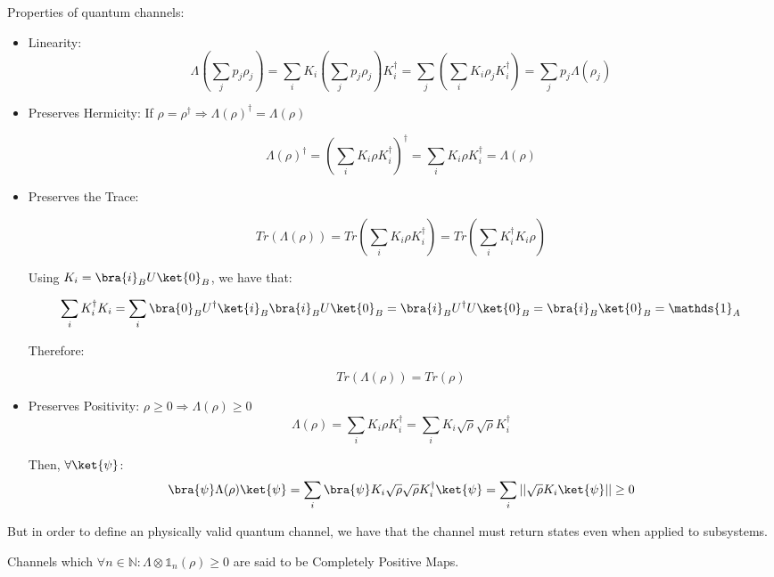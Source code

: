 Properties of quantum channels:
\begin{itemize}
    \item Linearity: 
    \begin{equation}
        \Lambda(\sum_j p_j \rho_j) = \sum_i K_i (\sum_j p_j \rho_j) K_i^\dagger = \sum_j \left( \sum_i K_i \rho_j K_i^\dagger \right) = \sum_j p_j \Lambda(\rho_j)
    \end{equation}
    
    
    \item Preserves Hermicity: If $\rho = \rho^\dagger \Rightarrow \Lambda(\rho)^\dagger = \Lambda(\rho)$
    
    \begin{equation}
        \Lambda(\rho)^\dagger = \left( \sum_i K_i \rho K_i^\dagger\right) ^\dagger =  \sum_i K_i \rho K_i^\dagger = \Lambda(\rho)
    \end{equation}
    \item Preserves the Trace:
    
    \begin{equation}
        Tr(\Lambda(\rho)) = Tr(\sum_i K_i \rho K_i^\dagger) = Tr(\sum_i K_i^\dagger K_i \rho)
    \end{equation}
    
    Using $K_i = \bra{i}_B U \ket{0}_B$, we have that:
    
    \begin{equation}
        \sum_i K_i^\dagger K_i = \sum_i \bra{0}_B U^\dagger \ket{i}_B  \bra{i}_B U \ket{0}_B =  \bra{i}_B U^\dagger U \ket{0}_B = \bra{i}_B \ket{0}_B = \mathds{1}_A 
    \end{equation}
    
    Therefore: 
    
    \begin{equation}
        Tr(\Lambda(\rho)) = Tr(\rho)
    \end{equation}
    
    \item Preserves Positivity: $\rho \geq 0 \Rightarrow \Lambda(\rho) \geq 0$
    \begin{equation}
        \Lambda(\rho) = \sum_i K_i \rho K_i^\dagger = \sum_i K_i \sqrt{\rho} \sqrt{\rho} K_i^\dagger
    \end{equation}
    
    Then, $\forall \ket{\psi}$: 
    \begin{equation}
        \bra{\psi} \Lambda(\rho) \ket{\psi} = \sum_i \bra{\psi} K_i \sqrt{\rho} \sqrt{\rho} K_i^\dagger \ket{\psi} = \sum_i || \sqrt{\rho} K_i \ket{\psi} || \geq 0
    \end{equation}
    
\end{itemize}

But in order to define an physically valid quantum channel, we have that the channel must return states even when applied to subsystems.

Channels which $\forall n \in \mathbb{N}: \Lambda \otimes \mathds{1}_n(\rho) \geq 0$ are said to be Completely Positive Maps.